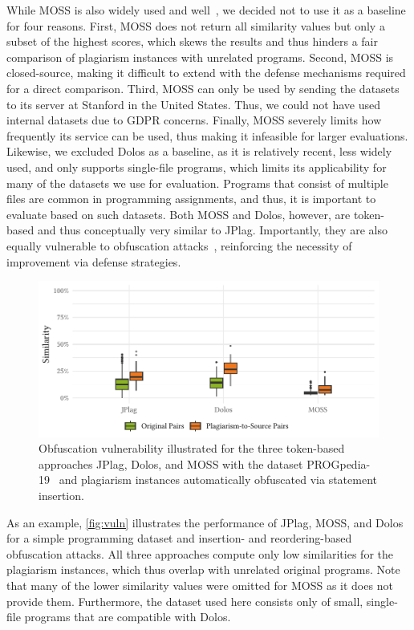 While MOSS is also widely used and well~\cite{Novak2019}, we decided not to use it as a baseline for four reasons. First, MOSS does not return all similarity values but only a subset of the highest scores, which skews the results and thus hinders a fair comparison of plagiarism instances with unrelated programs. Second, MOSS is closed-source, making it difficult to extend with the defense mechanisms required for a direct comparison. Third, MOSS can only be used by sending the datasets to its server at Stanford in the United States. Thus, we could not have used internal datasets due to \ac{GDPR} concerns. Finally, MOSS severely limits how frequently its service can be used, thus making it infeasible for larger evaluations.
Likewise, we excluded Dolos as a baseline, as it is relatively recent, less widely used, and only supports single-file programs, which limits its applicability for many of the datasets we use for evaluation. Programs that consist of multiple files are common in programming assignments, and thus, it is important to evaluate based on such datasets.
%
Both MOSS and Dolos, however, are token-based and thus conceptually very similar to JPlag.
Importantly, they are also equally vulnerable to obfuscation attacks~\cite{DevoreMcDonald2020, Saglam2024c}, reinforcing the necessity of improvement via defense strategies. 

\begin{figure}[b]
    \centering
    \includegraphics[width=0.99\linewidth]{figures/methodology/vulnerability_avg.similarity.pdf}
    \caption[Obfuscation Vulnerability of Different Detection Systems]{Obfuscation vulnerability illustrated for the three token-based approaches JPlag, Dolos, and MOSS with the dataset PROGpedia-19~\cite{paiva2023} and plagiarism instances automatically obfuscated via statement insertion.}
    \label{fig:vuln}
\end{figure}

As an example, \autoref{fig:vuln} illustrates the performance of JPlag, MOSS, and Dolos for a simple programming dataset and insertion- and reordering-based obfuscation attacks.
All three approaches compute only low similarities for the plagiarism instances, which thus overlap with unrelated original programs.
Note that many of the lower similarity values were omitted for MOSS as it does not provide them. Furthermore, the dataset used here consists only of small, single-file programs that are compatible with Dolos.

